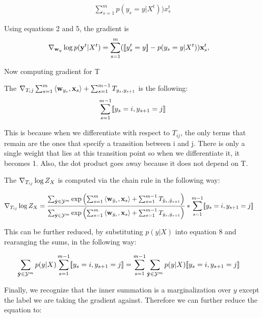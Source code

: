 \documentclass[11pt]{report}
\begin{document}
	\begin{align}
	 \sum_{s=1}^m {p(y_s=y | X^t))}x_s^t
	\end{align}

	Using equations 2 and 5, the gradient is 
	\begin{align}
		{\nabla}_{\mathbf{\boldsymbol{w}}_y} \log p(\mathbf{\boldsymbol{y}}^t|X^t) &= \sum_{s=1}^m ([\![y^t_s = y]\!] - p(y_s = y | X^t)) \mathbf{\boldsymbol{x}}^t_s,
	\end{align}
	


	Now computing gradient for T


	The ${\nabla}_{T_ij} \sum_{s=1}^m \left\langle \mathbf{\boldsymbol{w}}_{y_s},\mathbf{\boldsymbol{x}}_s \right\rangle + \sum_{s=1}^{m-1} T_{y_s, y_{s+1}}$ is the following:
	\begin{align}
	\sum_{s=1}^{m-1} [\![y_s = i, y_{s+1} = j]\!]
	\end{align}

	This is because when we differentiate with respect to $T_{ij}$, the only terms that remain are the ones that specify a transition between i and j. There is only a single weight that lies at this transition point so when we differentiate it, it becomes 1. Also, the dot product goes away because it does not depend on T.

	The ${\nabla}_{T_{ij}} \log Z_X$ is computed via the chain rule in the following way:

	\begin{align}
	{\nabla}_{T_{ij}} \log Z_X &= \frac{ \sum_{\hat{\mathbf{\boldsymbol{y}}} \in \mathcal{Y}^m} \exp \left(\sum_{s=1}^m \left\langle \mathbf{\boldsymbol{w}}_{\hat{y}_s},\mathbf{\boldsymbol{x}}_s \right\rangle + \sum_{s=1}^{m-1} T_{\hat{y}_s, \hat{y}_{s+1}}\right) }
	{\sum_{\hat{\mathbf{\boldsymbol{y}}} \in \mathcal{Y}^m} \exp \left(\sum_{s=1}^m \left\langle \mathbf{\boldsymbol{w}}_{\hat{y}_s},\mathbf{\boldsymbol{x}}_s \right\rangle + \sum_{s=1}^{m-1} T_{\hat{y}_s, \hat{y}_{s+1}}\right)} * \sum_{s=1}^{m-1} [\![y_s = i, y_{s+1} = j]\!]
	\end{align}


	This can be further reduced, by substituting $p(y|X)$ into equation 8 and rearanging the sums, in the following way:

	\begin{align}
	\sum_{\hat{\mathbf{\boldsymbol{y}}} \in \mathcal{Y}^m} p(y|X) \sum_{s=1}^{m-1} [\![y_s = i, y_{s+1} = j]\!] &= \sum_{s=1}^{m-1}  \sum_{\hat{\mathbf{\boldsymbol{y}}} \in \mathcal{Y}^m}   p(y|X)[\![y_s = i, y_{s+1} = j]\!]
	\end{align}


	Finally, we recognize that the inner summation is a marginalization over $y$ except the label we are taking the gradient against. Therefore we can further reduce the equation to:
\end{document}
